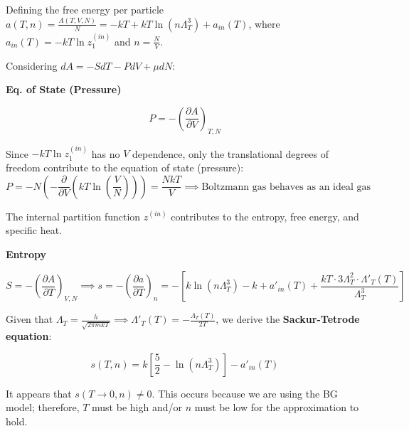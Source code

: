 \documentclass[12pt,a4paper]{report}
\newcommand{\esp}{\vspace{0.5cm}}
\begin{document}
	Defining the free energy per particle $a(T, n) = \frac{A(T, V, N)}{N} = -kT + kT \ln(n \Lambda_T^3) + a_{in}(T)$, where $a_{in}(T) = -kT \ln z_1^{(in)}$ and $n = \frac{N}{V}$.
	
	\esp
	
	Considering $dA = -SdT - PdV + \mu dN$:
	
	\esp
	
	\noindent \textbf{Eq. of State (Pressure)}
	
	\begin{equation}
		P = -\left( \frac{\partial A}{\partial V} \right)_{T, N}
	\end{equation}
	
	\esp
	
	Since $-kT \ln z_1^{(in)}$ has no $V$ dependence, only the translational degrees of freedom contribute to the equation of state (pressure):
	\begin{equation}
		P = -N \left( - \frac{\partial}{\partial V} (kT \ln(\frac{V}{N})) \right) = \frac{NkT}{V} \implies \text{Boltzmann gas behaves as an ideal gas}
	\end{equation}
	
	\esp
	
	The internal partition function $z^{(in)}$ contributes to the entropy, free energy, and specific heat.
	
	\esp
	
	\noindent \textbf{Entropy}
	
	\begin{equation}
		S = -\left( \frac{\partial A}{\partial T} \right)_{V, N} \implies s = -\left( \frac{\partial a}{\partial T} \right)_n = -\left[ k \ln(n \Lambda_T^3) - k + a'_{in}(T) + \frac{kT \cdot 3\Lambda_T^2 \cdot \Lambda'_T(T)}{\Lambda_T^3} \right]
	\end{equation}
	
	\esp
	
	Given that $\Lambda_T = \frac{h}{\sqrt{2\pi mkT}} \implies \Lambda'_T(T) = -\frac{\Lambda_T(T)}{2T}$, we derive the \textbf{Sackur-Tetrode equation}:
	
	\esp
	
	\begin{equation}
		s(T, n) = k \left[ \frac{5}{2} - \ln(n \Lambda_T^3) \right] - a'_{in}(T)
	\end{equation}
	
	\esp
	
	It appears that $s(T \to 0, n) \neq 0$. This occurs because we are using the BG model; therefore, $T$ must be high and/or $n$ must be low for the approximation to hold.
	
\end{document}
